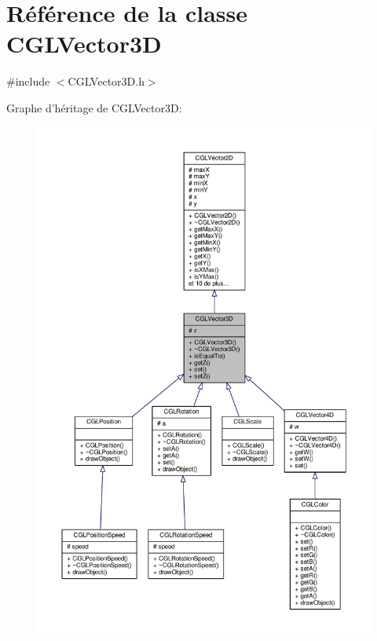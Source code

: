 \hypertarget{class_c_g_l_vector3_d}{\section{Référence de la classe C\-G\-L\-Vector3\-D}
\label{class_c_g_l_vector3_d}
}


{\ttfamily \#include $<$C\-G\-L\-Vector3\-D.\-h$>$}



Graphe d'héritage de C\-G\-L\-Vector3\-D\-:
\nopagebreak
\begin{figure}[H]
\begin{center}
\leavevmode
\includegraphics[width=350pt]{d0/d49/class_c_g_l_vector3_d__inherit__graph}
\end{center}
\end{figure}


